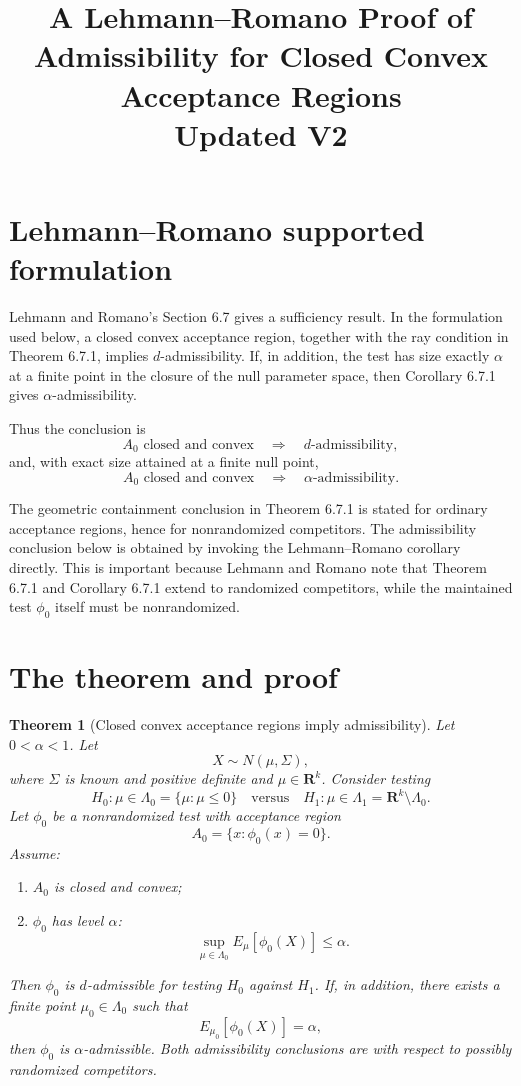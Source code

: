 \documentclass[11pt]{article}
\title{A Lehmann--Romano Proof of Admissibility for Closed Convex Acceptance Regions\\Updated V2}
\date{}
\newtheorem{theorem}{Theorem}
\begin{document}
\maketitle

\section{Lehmann--Romano supported formulation}

Lehmann and Romano's Section 6.7 gives a sufficiency result.  In the formulation used below, a closed convex acceptance region, together with the ray condition in Theorem 6.7.1, implies $d$-admissibility.  If, in addition, the test has size exactly $\alpha$ at a finite point in the closure of the null parameter space, then Corollary 6.7.1 gives $\alpha$-admissibility.

Thus the conclusion is
\[
A_0\text{ closed and convex}\quad\Longrightarrow\quad d\text{-admissibility},
\]
and, with exact size attained at a finite null point,
\[
A_0\text{ closed and convex}\quad\Longrightarrow\quad \alpha\text{-admissibility}.
\]

The geometric containment conclusion in Theorem 6.7.1 is stated for ordinary acceptance regions, hence for nonrandomized competitors.  The admissibility conclusion below is obtained by invoking the Lehmann--Romano corollary directly.  This is important because Lehmann and Romano note that Theorem 6.7.1 and Corollary 6.7.1 extend to randomized competitors, while the maintained test $\phi_0$ itself must be nonrandomized.

\section{The theorem and proof}

\begin{theorem}[Closed convex acceptance regions imply admissibility]
Let $0<\alpha<1$. Let
\[
X\sim N(\mu,\Sigma),
\]
where $\Sigma$ is known and positive definite and $\mu\in\mathbf R^k$. Consider testing
\[
H_0:\mu\in\Lambda_0=\{\mu:\mu\le 0\}
\quad\text{versus}\quad
H_1:\mu\in\Lambda_1=\mathbf R^k\setminus\Lambda_0.
\]
Let $\phi_0$ be a nonrandomized test with acceptance region
\[
A_0=\{x:\phi_0(x)=0\}.
\]
Assume:
\begin{enumerate}[label=(\roman*)]
\item $A_0$ is closed and convex;
\item $\phi_0$ has level $\alpha$:
\[
\sup_{\mu\in\Lambda_0} E_\mu[\phi_0(X)]\le \alpha.
\]
\end{enumerate}
Then $\phi_0$ is $d$-admissible for testing $H_0$ against $H_1$. If, in addition, there exists a finite point $\mu_0\in\Lambda_0$ such that
\[
E_{\mu_0}[\phi_0(X)]=\alpha,
\]
then $\phi_0$ is $\alpha$-admissible.  Both admissibility conclusions are with respect to possibly randomized competitors.
\end{theorem}
\end{document}
